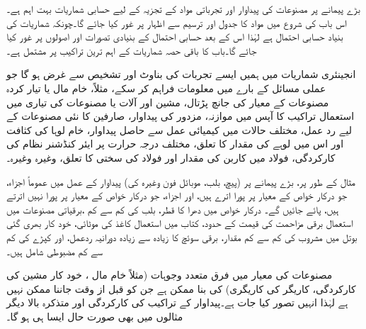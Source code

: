 بڑے پیمانے پر مصنوعات کی پیداوار اور تجرباتی مواد کے تجزیہ  کے لیے حسابی شماریات بہت اہم ہے۔ اس باب کی شروع میں مواد کا جدول اور ترسیم سے اظہار پر غور کیا جائے گا۔چونکہ شماریات کی بنیاد حسابی احتمال ہے لہٰذا  اس کے بعد حسابی احتمال کے بنیادی تصورات اور اصولوں پر غور کیا جائے گا۔باب کا باقی حصہ شماریات کے اہم ترین تراکیب پر مشتمل ہے۔

انجینئری شماریات میں ہمیں ایسے تجربات کی بناوٹ اور تشخیص سے غرض ہو گا جو عملی مسائل کے بارے میں معلومات فراہم کر سکے، مثلاً، خام مال  یا تیار کردہ مصنوعات کے معیار کی جانچ پڑتال، مشین اور آلات یا مصنوعات کی تیاری میں استعمال تراکیب کا آپس میں موازنہ، مزدور کی پیداوار، صارفین کا نئی مصنوعات کے لیے رد عمل،  مختلف حالات میں کیمیائی عمل سے حاصل پیداوار، خام لوہا کی کثافت اور اس میں لوہے کی مقدار کا تعلق،  مختلف درجہ حرارت پر ایئر کنڈشنر  نظام کی کارکردگی، فولاد میں کاربن کی مقدار اور فولاد کی  سختی کا تعلق، وغیرہ وغیرہ۔

مثال کے طور پر، بڑے پیمانے پر (پیچ، بلب، موبائل فون وغیرہ کی) پیداوار کے عمل میں عموماً   اجزاء، جو درکار خواص کے معیار پر پورا اترے ہیں،  اور   اجزاء، جو درکار خواص کے معیار پر پورا نہیں اترتے ہیں، پائے جائیں گے۔  درکار خواص میں دھرا کا قطر، بلب کی کم سے کم ،برقیاتی مصنوعات میں استعمال برقی مزاحمت کی قیمت کے حدود، کتاب میں استعمال کاغذ کی موٹائی، خود کار بھری گئی بوتل میں مشروب کی کم سے کم مقدار، برقی سوئچ کا زیادہ سے زیادہ دورانیہ ردعمل، اور کپڑے کی کم سے کم  مضبوطی شامل ہیں۔

مصنوعات کی معیار میں فرق متعدد وجوہات (مثلاً خام مال ، خود کار مشین کی کارکردگی، کاریگر  کی کاریگری) کی بنا ممکن ہے جن کو قبل از وقت جاننا ممکن نہیں ہے لہٰذا انہیں  تصور کیا جات ہے۔پیداوار کے تراکیب کی کارکردگی اور متذکرہ بالا دیگر مثالوں میں بھی صورت حال ایسا ہی ہو گا۔ 

